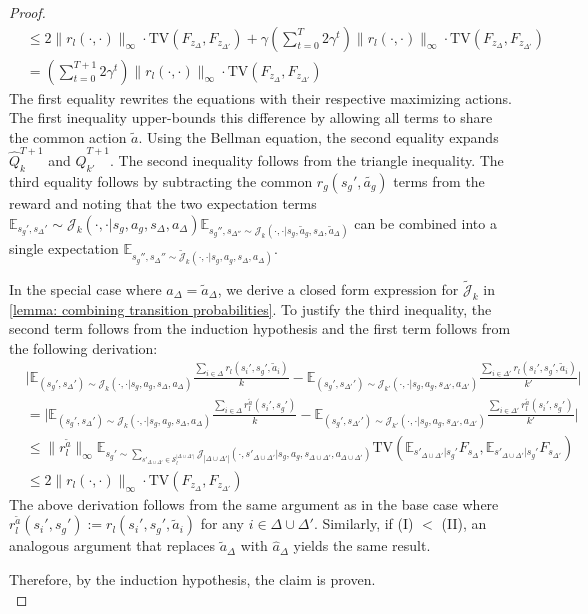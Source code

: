 \documentclass[10pt,a4paper]{amsart}
\def\E{\mathbb{E}}
\begin{document}
\begin{proof}
\begin{align*}
&\leq 2\|r_l(\cdot,\cdot)\|_\infty \cdot \mathrm{TV}(F_{z_\Delta}, F_{z_{\Delta'}}) +  \gamma\left(\sum_{t=0}^{T}2\gamma^t\right)\|r_l(\cdot,\cdot)\|_\infty\cdot\mathrm{TV}(F_{z_\Delta}, F_{z_{\Delta'}}) \\
&= \left(\sum_{t=0}^{T+1}2\gamma^t\right)\|r_l(\cdot,\cdot)\|_\infty\cdot \mathrm{TV}(F_{z_\Delta}, F_{z_{\Delta'}})
\end{align*}
The first equality rewrites the equations with their respective maximizing actions. The first inequality upper-bounds this difference by allowing all terms to share the common action $\tilde{a}$. Using the Bellman equation, the second equality expands $\hat{Q}_k^{T+1}$ and $\hat{Q}_{k'}^{T+1}$. The second inequality follows from the triangle inequality. The third equality follows by subtracting the common $r_g(s_g',\tilde{a_g})$ terms from the reward and noting that the two expectation terms $\E_{s_g',s_\Delta'}\sim\mathcal{J}_k(\cdot,\cdot|s_g,a_g,s_\Delta,a_\Delta)\E_{s_g'',s_{\Delta''}\sim\mathcal{J}_k(\cdot,\cdot|s_g,\tilde{a}_g, s_\Delta, \tilde{a}_\Delta)}$ can be combined into a single expectation $\E_{s_g'',s_\Delta''\sim\tilde{\mathcal{J}}_k(\cdot,\cdot|s_g,a_g,s_\Delta,a_\Delta)}$.

In the special case where $a_\Delta = \tilde{a}_\Delta$, we derive a closed form expression for $\tilde{\mathcal{J}}_k$ in \cref{lemma: combining transition probabilities}. To justify the third inequality, the second term follows from the induction hypothesis and the first term follows from the following derivation:
\begin{align*}
&\bigg|\E_{(s_g',s_\Delta')\sim\mathcal{J}_k(\cdot,\cdot|s_g,a_g,s_\Delta,a_\Delta)} \frac{\sum_{i\in\Delta}r_l(s_i',s_g',\tilde{a}_i)}{k} - \E_{(s_g',s_{\Delta'}')\sim\mathcal{J}_{k'}(\cdot,\cdot|s_g,a_g,s_{\Delta'},a_{\Delta'})}\frac{\sum_{i\in\Delta'}r_l(s_i',s_g',\tilde{a}_i)}{k'}\bigg| \\
&= \bigg|\E_{(s_g',s_\Delta')\sim\mathcal{J}_k(\cdot,\cdot|s_g,a_g,s_\Delta,a_\Delta)} \frac{\sum_{i\in\Delta}r^{\tilde{a}}_l(s_i',s_g')}{k} - \E_{(s_g',s_{\Delta'}')\sim\mathcal{J}_{k'}(\cdot,\cdot|s_g,a_g,s_{\Delta'},a_{\Delta'})}\frac{\sum_{i\in\Delta'}r_l^{\tilde{a}}(s_i',s_g')}{k'}\bigg| \\
&\leq \|r_l^{\tilde{a}}\|_\infty \E_{s_g'\sim \sum_{s'_{\Delta\cup\Delta'}\in\mathcal{S}_l^{|\Delta\cup\Delta'|}}\mathcal{J}_{|\Delta\cup\Delta'|}(\cdot,s'_{\Delta\cup\Delta'}|s_g,a_g,s_{\Delta\cup\Delta'},a_{\Delta\cup\Delta'})}\mathrm{TV}(\E_{s'_{\Delta\cup\Delta'}|s_g'} F_{s_{\Delta}}, \E_{s'_{\Delta\cup\Delta'}|s_g'} F_{s_{\Delta'}}) \\
&\leq 2\|r_l(\cdot,\cdot)\|_\infty\cdot \mathrm{TV}(F_{z_\Delta}, F_{z_{\Delta'}})
\end{align*}
The above derivation follows from the same argument as in the base case where $r_l^{\tilde{a}}(s_i',s_g'):=r_l(s_i',s_g',\tilde{a}_i)$ for any $i\in\Delta\cup\Delta'$. Similarly, if (I) $ < $ (II), an analogous argument that replaces $\tilde{a}_\Delta$ with $\hat{a}_\Delta$ yields the same result.

Therefore, by the induction hypothesis, the claim is proven.\qedhere \\
\end{proof}
\end{document}

